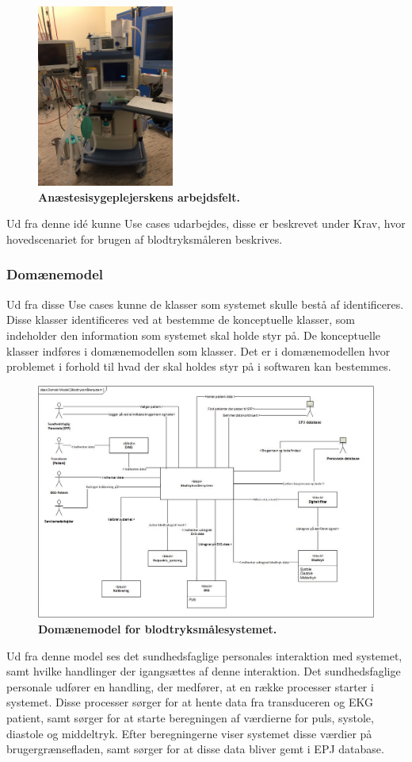 \begin{figure}[H]
\includegraphics[width =0.4\textwidth , center]{billeder/anastesi}
\caption{\textbf{Anæstesisygeplejerskens arbejdsfelt.}}
\end{figure}
Ud fra denne idé kunne Use cases udarbejdes, disse er beskrevet under Krav, hvor hovedscenariet for brugen af blodtryksmåleren beskrives.
\subsubsection{Domænemodel} 
Ud fra disse Use cases kunne de klasser som systemet skulle bestå af identificeres. Disse klasser identificeres ved at bestemme de konceptuelle klasser, som indeholder den information som systemet skal holde styr på. De konceptuelle klasser indføres i domænemodellen som klasser. Det er i domænemodellen hvor problemet i forhold til hvad der skal holdes styr på i softwaren kan bestemmes. 
\begin{figure}[H]
\includegraphics[width =1.0\textwidth , center]{billeder/DM}
\caption{\textbf{Domænemodel for blodtryksmålesystemet.}}
\end{figure}
Ud fra denne model ses det sundhedsfaglige personales interaktion med systemet, samt hvilke handlinger der igangsættes af denne interaktion. Det sundhedsfaglige personale udfører en handling, der medfører, at en række processer starter i systemet. Disse processer sørger for at hente data fra transduceren og EKG patient, samt sørger for at starte beregningen af værdierne for puls,
systole, diastole og middeltryk. Efter beregningerne viser systemet disse værdier på brugergrænsefladen, samt sørger for at disse data bliver gemt i EPJ database. 

